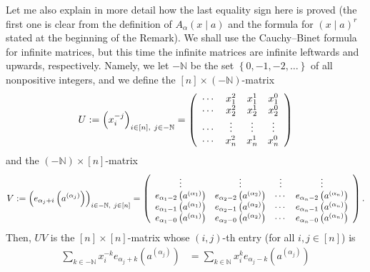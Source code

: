 \documentclass[numbers=enddot,12pt,final,onecolumn,notitlepage]{scrartcl}%
\theoremstyle{definition}
\let\sumnonlimits\sum
\renewcommand{\sum}{\sumnonlimits\limits}
\begin{document}
\begin{enumerate}
Let me also explain in more detail how the last equality sign here is proved
(the first one is clear from the definition of $A_{\alpha}\left(  x\mid
a\right)  $ and the formula for $\left(  x\mid a\right)  ^{r}$ stated at the
beginning of the Remark). We shall use the Cauchy--Binet formula for infinite
matrices, but this time the infinite matrices are infinite leftwards and
upwards, respectively. Namely, we let $-\mathbb{N}$ be the set $\left\{
0,-1,-2,\ldots\right\}  $ of all nonpositive integers, and we define the
$\left[  n\right]  \times\left(  -\mathbb{N}\right)  $-matrix
\[
U:=\left(  x_{i}^{-j}\right)  _{i\in\left[  n\right]  ,\ j\in-\mathbb{N}%
}=\left(
\begin{array}
[c]{cccc}%
\cdots & x_{1}^{2} & x_{1}^{1} & x_{1}^{0}\\
\cdots & x_{2}^{2} & x_{2}^{1} & x_{2}^{0}\\
\cdots & \vdots & \vdots & \vdots\\
\cdots & x_{n}^{2} & x_{n}^{1} & x_{n}^{0}%
\end{array}
\right)
\]
and the $\left(  -\mathbb{N}\right)  \times\left[  n\right]  $-matrix%
\[
V:=\left(  e_{\alpha_{j}+i}\left(  a^{\left(  \alpha_{j}\right)  }\right)
\right)  _{i\in-\mathbb{N},\ j\in\left[  n\right]  }=\left(
\begin{array}
[c]{cccc}%
\vdots & \vdots & \vdots & \vdots\\
e_{\alpha_{1}-2}\left(  a^{\left(  \alpha_{1}\right)  }\right)  &
e_{\alpha_{2}-2}\left(  a^{\left(  \alpha_{2}\right)  }\right)  & \cdots &
e_{\alpha_{n}-2}\left(  a^{\left(  \alpha_{n}\right)  }\right) \\
e_{\alpha_{1}-1}\left(  a^{\left(  \alpha_{1}\right)  }\right)  &
e_{\alpha_{2}-1}\left(  a^{\left(  \alpha_{2}\right)  }\right)  & \cdots &
e_{\alpha_{n}-1}\left(  a^{\left(  \alpha_{n}\right)  }\right) \\
e_{\alpha_{1}-0}\left(  a^{\left(  \alpha_{1}\right)  }\right)  &
e_{\alpha_{2}-0}\left(  a^{\left(  \alpha_{2}\right)  }\right)  & \cdots &
e_{\alpha_{n}-0}\left(  a^{\left(  \alpha_{n}\right)  }\right)
\end{array}
\right)  .
\]
Then, $UV$ is the $\left[  n\right]  \times\left[  n\right]  $-matrix whose
$\left(  i,j\right)  $-th entry (for all $i,j\in\left[  n\right]  $) is%
\begin{align*}
\sum_{k\in-\mathbb{N}}x_{i}^{-k}e_{\alpha_{j}+k}\left(  a^{\left(  \alpha
_{j}\right)  }\right)   &  =\sum_{k\in\mathbb{N}}x_{i}^{k}e_{\alpha_{j}%
-k}\left(  a^{\left(  \alpha_{j}\right)  }\right) \\

\end{align*}
\end{enumerate}
\end{document}
